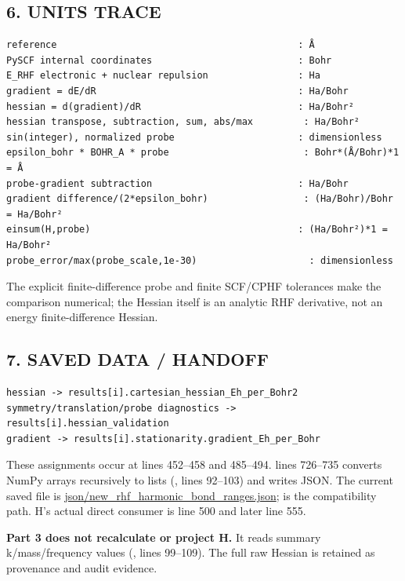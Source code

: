 \documentclass[10pt,a4paper]{article}
\begin{document}
\subsection{6. UNITS TRACE}
\begin{Verbatim}
reference                                           : Å
PySCF internal coordinates                          : Bohr
E_RHF electronic + nuclear repulsion                : Ha
gradient = dE/dR                                    : Ha/Bohr
hessian = d(gradient)/dR                            : Ha/Bohr²
hessian transpose, subtraction, sum, abs/max         : Ha/Bohr²
sin(integer), normalized probe                      : dimensionless
epsilon_bohr * BOHR_A * probe                        : Bohr*(Å/Bohr)*1 = Å
probe-gradient subtraction                          : Ha/Bohr
gradient difference/(2*epsilon_bohr)                 : (Ha/Bohr)/Bohr = Ha/Bohr²
einsum(H,probe)                                     : (Ha/Bohr²)*1 = Ha/Bohr²
probe_error/max(probe_scale,1e-30)                    : dimensionless
\end{Verbatim}
The explicit finite-difference probe and finite SCF/CPHF tolerances make the comparison numerical; the Hessian itself is an analytic RHF derivative, not an energy finite-difference Hessian.

\subsection{7. SAVED DATA / HANDOFF}
\begin{Verbatim}
hessian -> results[i].cartesian_hessian_Eh_per_Bohr2
symmetry/translation/probe diagnostics -> results[i].hessian_validation
gradient -> results[i].stationarity.gradient_Eh_per_Bohr
\end{Verbatim}
These assignments occur at lines 452–458 and 485–494.  lines 726–735 converts NumPy arrays recursively to lists (, lines 92–103) and writes JSON. The current saved file is \href{/Users/novaz/Desktop/qml2.0/json/new\_rhf\_harmonic\_bond\_ranges.json}{json/new\_rhf\_harmonic\_bond\_ranges.json};  is the compatibility path. H's actual direct consumer is  line 500 and later  line 555.

\textbf{Part 3 does not recalculate or project H.} It reads summary k/mass/frequency values (, lines 99–109). The full raw Hessian is retained as provenance and audit evidence.
\end{document}
